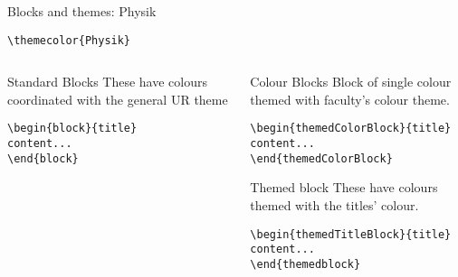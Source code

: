 \begingroup
{}
\begin{frame}[fragile]{Blocks and themes: Physik}
    \begin{center}\verb|\themecolor{Physik}|\end{center}
\begin{columns} %
\begin{column}{0.3\textwidth}
\begin{block}{Standard Blocks}
These have colours coordinated with the general UR theme
\begin{verbatim}
\begin{block}{title}
content...
\end{block}
\end{verbatim}
\end{block}
\end{column}
\begin{column}{0.7\textwidth}
\begin{themedColorBlock}{Colour Blocks}
Block of single colour themed with faculty's colour theme.
\small
\begin{verbatim}
\begin{themedColorBlock}{title}
content...
\end{themedColorBlock}
\end{verbatim}
\end{themedColorBlock}
\begin{themedTitleBlock} {Themed block}
These have colours themed with the titles' colour.
\small
\begin{verbatim}
\begin{themedTitleBlock}{title}
content...
\end{themedblock}
\end{verbatim}
\end{themedTitleBlock}
\end{column}
\end{columns}
\end{frame}
\endgroup


